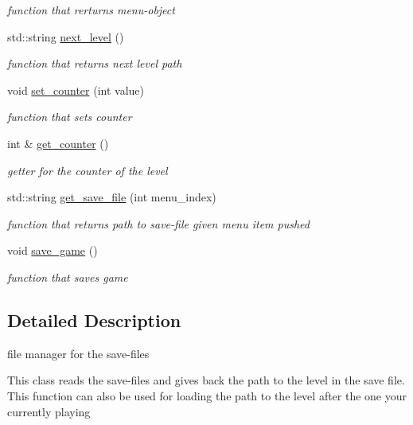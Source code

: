 \begin{DoxyCompactItemize}
\begin{DoxyCompactList}\small\item\em function that rerturns menu-\/object \end{DoxyCompactList}\item 
std\+::string \hyperlink{classfile__management_a75689c420580c71f0621dfbcc4c2a06f}{next\+\_\+level} ()
\begin{DoxyCompactList}\small\item\em function that returns next level path \end{DoxyCompactList}\item 
void \hyperlink{classfile__management_a291475384add5bdb8002127c71c568ac}{set\+\_\+counter} (int value)
\begin{DoxyCompactList}\small\item\em function that sets counter \end{DoxyCompactList}\item 
int \& \hyperlink{classfile__management_ae6291547fab57a5b861c52e970175854}{get\+\_\+counter} ()
\begin{DoxyCompactList}\small\item\em getter for the counter of the level \end{DoxyCompactList}\item 
std\+::string \hyperlink{classfile__management_a92ece2d05964c828dcb9bf6c59043327}{get\+\_\+save\+\_\+file} (int menu\+\_\+index)
\begin{DoxyCompactList}\small\item\em function that returns path to save-\/file given menu item pushed \end{DoxyCompactList}\item 
void \hyperlink{classfile__management_a79e6ae7cec63aa959d7d0730d6ffa5a3}{save\+\_\+game} ()
\begin{DoxyCompactList}\small\item\em function that saves game \end{DoxyCompactList}\end{DoxyCompactItemize}


\subsection{Detailed Description}
file manager for the save-\/files 

This class reads the save-\/files and gives back the path to the level in the save file. This function can also be used for loading the path to the level after the one your currently playing

